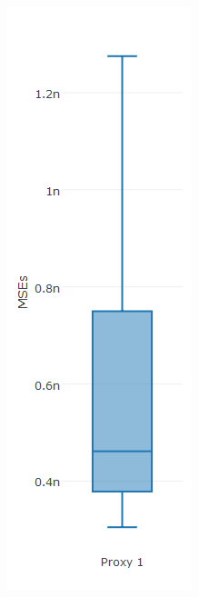 \begin{figure}[!h]
{\begin{subfigure}{.25\linewidth}
  \includegraphics[width=\linewidth]{img/6msigmaMsebpNaive.png}

\end{subfigure}}
\end{figure}
